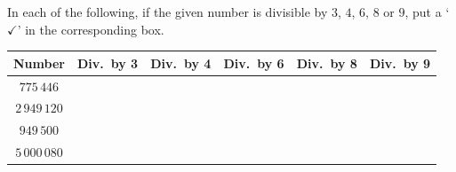  In each of the following, if the given number is divisible by $3$, $4$, $6$, $8$ or $9$, put a `$\checkmark$' in the corresponding box.
\par\finishquestion

\begin{center}
\small
\begin{tabular}{|c|c|c|c|c|c|}
\hline
\textbf{Number} & \textbf{Div.\ by 3} & \textbf{Div.\ by 4} & \textbf{Div.\ by 6} & \textbf{Div.\ by 8} & \textbf{Div.\ by 9}\\
\hline
$775\,446$ & & & & & \\ \hline
$2\,949\,120$ & & & & & \\ \hline
$949\,500$ & & & & & \\ \hline
$5\,000\,080$ & & & & & \\ \hline
\end{tabular}
\end{center}
